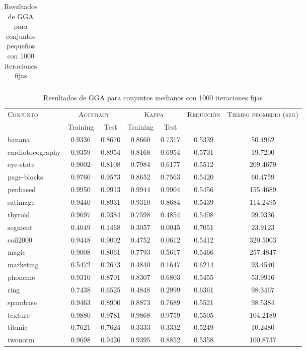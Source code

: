 \begin{table}[]
\begin{tabular}{l c c c c c c}
\hline
\end{tabular}
\caption{Resultados de GGA para conjuntos pequeños con 1000 iteraciones fijas}
\label{res-peq-gga}
\end{table}


\begin{table}[]
\centering
\begin{tabular}{l c c c c c c}
\hline
\multirow{2}{*}{\textsc{Conjunto}}
	& \multicolumn{2}{c}{\textsc{Accuracy}}
	& \multicolumn{2}{c}{\textsc{Kappa}}
	& \textsc{Reducción}
	& \textsc{Tiempo promedio (seg)} \\
	& Training & Test
	& Training & Test \\ 
\hline
\hline

banana & 0.9336 & 0.8670 & 0.8660 & 0.7317 & 0.5339 & 50.4962 \\
cardiotocography & 0.9359 & 0.8954 & 0.8168 & 0.6954 & 0.5731 & 19.7200 \\
eye-state & 0.9002 & 0.8108 & 0.7984 & 0.6177 & 0.5512 & 209.4679 \\
page-blocks & 0.9760 & 0.9573 & 0.8652 & 0.7563 & 0.5420 & 60.4759 \\
penbased & 0.9950 & 0.9913 & 0.9944 & 0.9904 & 0.5456 & 155.4689 \\
satimage & 0.9440 & 0.8931 & 0.9310 & 0.8684 & 0.5439 & 114.2495 \\
thyroid & 0.9697 & 0.9384 & 0.7598 & 0.4854 & 0.5408 & 99.9336 \\
segment & 0.4049 & 0.1468 & 0.3057 & 0.0045 & 0.7051 & 23.9123 \\
coil2000 & 0.9448 & 0.9002 & 0.4752 & 0.0612 & 0.5412 & 320.5003 \\
magic & 0.9008 & 0.8061 & 0.7793 & 0.5617 & 0.5466 & 257.4847 \\
marketing & 0.5472 & 0.2673 & 0.4840 & 0.1647 & 0.6214 & 93.4540 \\
phoneme & 0.9310 & 0.8701 & 0.8307 & 0.6803 & 0.5455 & 53.9916 \\
ring & 0.7438 & 0.6525 & 0.4848 & 0.2999 & 0.6361 & 98.3467 \\
spambase & 0.9463 & 0.8900 & 0.8873 & 0.7689 & 0.5521 & 98.5384 \\
texture & 0.9880 & 0.9781 & 0.9868 & 0.9759 & 0.5505 & 104.2189 \\
titanic & 0.7621 & 0.7624 & 0.3333 & 0.3332 & 0.5249 & 10.2480 \\
twonorm & 0.9698 & 0.9426 & 0.9395 & 0.8852 & 0.5358 & 100.8737 \\

\hline
\end{tabular}
\caption{Resultados de GGA para conjuntos medianos con 1000 iteraciones fijas}
\label{res-med-gga}
\end{table}



